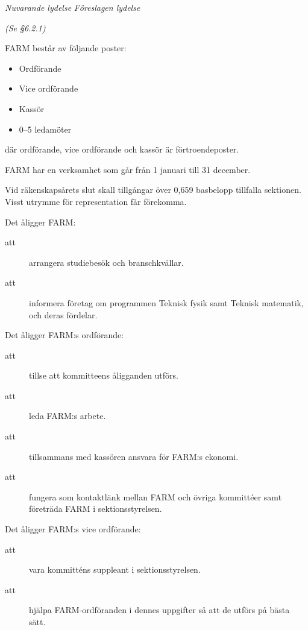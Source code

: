 \documentclass{article}
\newenvironment{lydelse}
    {\begin{paracol}{2}%
        \emph{Nuvarande lydelse}%
        \switchcolumn%
        \emph{Föreslagen lydelse}%
    \end{paracol}%
    \begin{enumerate}[label=\thesubsection.\arabic*]%
    \begin{paracol}{2}%
    }{\end{paracol}\end{enumerate}}
\begin{document}
\begin{lydelse}
    \setcounter{section}{6}
    \setcounter{subsection}{4}
    \item[] \emph{(Se \S6.2.1)}
    
    \item FARM består av följande poster:
	\begin{itemize}
		\item Ordförande
 		\item Vice ordförande
		\item Kassör
		\item 0--5 ledamöter
	\end{itemize}
    där ordförande, vice ordförande och kassör är förtroendeposter.
    \item FARM har en verksamhet som går från 1 januari till 31 december.

	\item Vid räkenskapsårets slut skall tillgångar över 0,659 basbelopp tillfalla sektionen. Visst utrymme för representation får förekomma.
    \item Det åligger FARM:
	\begin{description}
		\item[att] arrangera studiebesök och branschkvällar.   
		\item[att] informera företag om programmen Teknisk fysik samt Teknisk matematik, och deras fördelar.
	\end{description}
	
	\item Det åligger FARM:s ordförande:
	\begin{description}
		\item[att] tillse att kommitteens åligganden utförs.
		\item[att] leda FARM:s arbete.
		\item[att] tillsammans med kassören ansvara för FARM:s ekonomi.
		\item[att] fungera som kontaktlänk mellan FARM och övriga kommittéer samt företräda FARM i sektionsstyrelsen.
	\end{description}

    \item Det åligger FARM:s vice ordförande:
	\begin{description}
		\item[att] vara kommitténs suppleant i sektionsstyrelsen.
		\item[att] hjälpa FARM-ordföranden i dennes uppgifter så att de utförs på bästa sätt.
	\end{description}


\end{lydelse}
\end{document}

